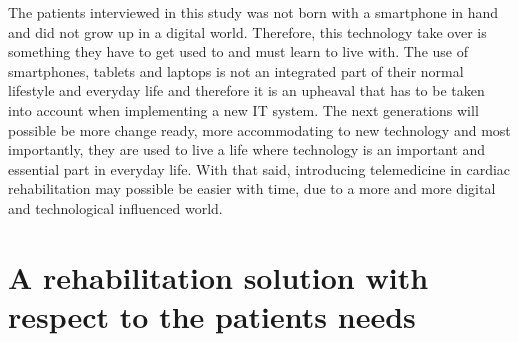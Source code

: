 The patients interviewed in this study was not born with a smartphone in hand and did not grow up in a digital world. Therefore, this technology take over is something they have to get used to and must learn to live with. The use of smartphones, tablets and laptops is not an integrated part of their normal lifestyle and everyday life and therefore it is an upheaval that has to be taken into account when implementing a new IT system. The next generations will possible be more change ready, more accommodating to new technology and most importantly, they are used to live a life where technology is an important and essential part in everyday life. With that said, introducing telemedicine in cardiac rehabilitation may possible be easier with time, due to a more and more digital and technological influenced world. 

\section{A rehabilitation solution with respect to the patients needs}
